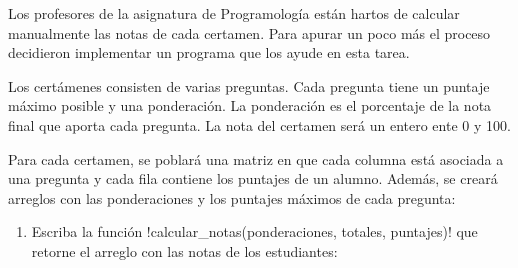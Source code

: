 Los profesores de la asignatura de Programología están hartos
de calcular manualmente las notas de cada certamen.
Para apurar un poco más el proceso
decidieron implementar un programa que los ayude en esta tarea.

Los certámenes consisten de varias preguntas.
Cada pregunta tiene un puntaje máximo posible y una ponderación.
La ponderación es el porcentaje de la nota final
que aporta cada pregunta.
La nota del certamen será un entero ente 0 y 100.

Para cada certamen,
se poblará una matriz en que cada columna está asociada a una pregunta
y cada fila contiene los puntajes de un alumno.
Además,
se creará arreglos con las ponderaciones y los puntajes máximos
de cada pregunta:



\begin{enumerate}[leftmargin=0pt,label=\emph{\alph*})]

  \item
    Escriba la función \li!calcular_notas(ponderaciones, totales, puntajes)!
    que retorne el arreglo con las notas de los estudiantes:
    

\end{enumerate}

